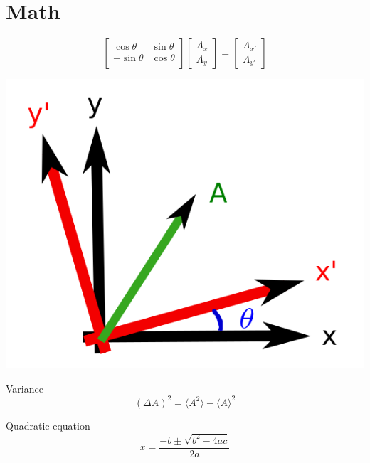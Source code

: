 \documentclass[12pt]{article}  %
\begin{document}
\section{Math}
\begin{equation}
\left[ \begin{array}{cc}
  \cos \theta & \sin \theta \\
-\sin \theta  & \cos \theta \\
 \end{array} \right]
\left[ \begin{array}{c}
A_x\\
A_y
\end{array}\right]
=
\left[ \begin{array}{c}
A_{x'}\\
A_{y'}
\end{array}\right]
\end{equation}
\begin{center}
 \includegraphics[scale=0.3]{pictures/coordinate_rotation}
\end{center}


Variance
\begin{equation}
(\Delta A)^2 = \langle A^2 \rangle - \langle A \rangle^2 
\end{equation}

Quadratic equation
\begin{equation}
 x = \frac{-b \pm \sqrt{b^2 - 4ac}}{2a}
\end{equation}


\end{document}
